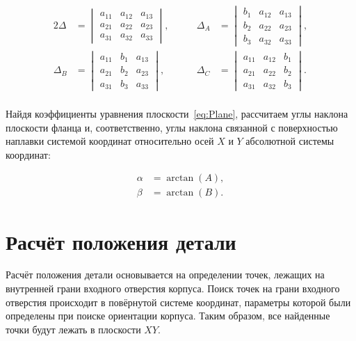 \begin{alignat*}{2}
    \Delta &= \begin{vmatrix}
                  a_{11} & a_{12} & a_{13} \\
                  a_{21} & a_{22} & a_{23} \\
                  a_{31} & a_{32} & a_{33}
    \end{vmatrix}, & \qquad
    \Delta_A &= \begin{vmatrix}
                    b_1 & a_{12} & a_{13} \\
                    b_2 & a_{22} & a_{23} \\
                    b_3 & a_{32} & a_{33}
    \end{vmatrix}, \\
    \Delta_B &= \begin{vmatrix}
                    a_{11} & b_1 & a_{13} \\
                    a_{21} & b_2 & a_{23} \\
                    a_{31} & b_3 & a_{33}
    \end{vmatrix}, & \qquad
    \Delta_C &= \begin{vmatrix}
                    a_{11} & a_{12} & b_1 \\
                    a_{21} & a_{22} & b_2 \\
                    a_{31} & a_{32} & b_3
    \end{vmatrix}.
\end{alignat*} \\

Найдя коэффициенты уравнения плоскости~\ref{eq:Plane}, рассчитаем углы наклона плоскости фланца и, соответственно, углы наклона связанной с поверхностью наплавки системой координат относительно осей $X$ и $Y$ абсолютной системы координат:

\begin{align*}
    \alpha &= \arctan(A), \\
    \beta &= \arctan(B).
\end{align*}


\section{Расчёт положения детали}
Расчёт положения детали основывается на определении точек, лежащих на внутренней грани входного отверстия корпуса.
Поиск точек на грани входного отверстия происходит в повёрнутой системе координат, параметры которой были определены при поиске ориентации корпуса.
Таким образом, все найденные точки будут лежать в плоскости $XY$.

